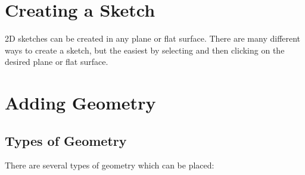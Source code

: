 \section{Creating a Sketch}

\cbstart
{}

2D sketches can be created in any plane or flat surface. There are many different ways to create a sketch, but the easiest by selecting  and then clicking on the desired plane or flat surface.
\cbend
\section{Adding Geometry}

\subsection{Types of Geometry}

\cbstart
{}

There are several types of geometry which can be placed:

